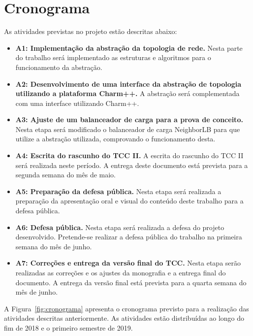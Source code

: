 \documentclass[
	12pt,				%
	openright,			%
	twoside,			%
	a4paper,			%
	english,			%
	brazil,				%
	]{abntex2}
\newcommand{\charm}{{{Charm++}}\xspace}
\begin{document}


\section{Cronograma}
\label{sec:cronograma}

As atividades previstas no projeto estão descritas abaixo:

\begin{itemize}
	\item \textbf{A1: Implementação da abstração da topologia de rede.} Nesta parte do trabalho será implementado as estruturas e algoritmos para o funcionamento da abstração.
	\item \textbf{A2: Desenvolvimento de uma interface da abstração de topologia utilizando a plataforma \charm.} A abstração será complementada com uma interface utilizando \charm.
	\item \textbf{A3: Ajuste de um balanceador de carga para a prova de conceito.} Nesta etapa será modificado o balanceador de carga NeighborLB para que utilize a abstração utilizada, comprovando o funcionamento desta.
	\item \textbf{A4: Escrita do rascunho do TCC II.} A escrita do rascunho do TCC II será realizada neste período. A entrega deste documento está prevista para a segunda semana do mês de maio.
	\item \textbf{A5: Preparação da defesa pública.} Nesta etapa será realizada a preparação da apresentação oral e visual do conteúdo deste trabalho para a defesa pública.
	\item \textbf{A6: Defesa pública.} Nesta etapa será realizada a defesa do projeto desenvolvido. Pretende-se realizar a defesa pública do trabalho na primeira semana do mês de junho.
	\item \textbf{A7: Correções e entrega da versão final do TCC.} Nesta etapa serão realizadas as correções e os ajustes da monografia e a entrega final do documento. A entrega da versão final está prevista para a quarta semana do mês de junho.
\end{itemize}

A Figura~\ref{fig:cronograma} apresenta o cronograma previsto para a realização das atividades descritas anteriormente. As atividades estão distribuídas ao longo do fim de 2018 e o primeiro semestre de 2019.
\end{document}
